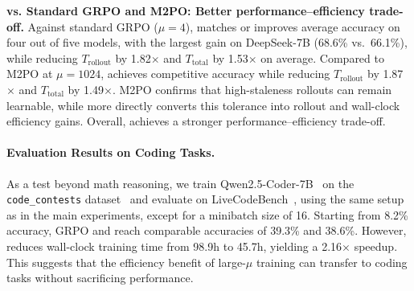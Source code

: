 \textbf{\boldmath \ourmethod{} vs. Standard GRPO and M2PO: Better performance--efficiency trade-off.}
Against standard GRPO ($\mu\!=\!4$), \ourmethod{} matches or improves average
accuracy on four out of five models, with the largest gain on
DeepSeek-7B (68.6\% vs.\ 66.1\%), while reducing $T_{\mathrm{rollout}}$ by
{1.82$\times$} and $T_{\mathrm{total}}$ by {1.53$\times$} on
average. Compared to M2PO at $\mu\!=\!1024$, \ourmethod{} achieves competitive accuracy while
reducing $T_{\mathrm{rollout}}$ by {1.87$\times$} and
$T_{\mathrm{total}}$ by {1.49$\times$}. M2PO confirms that high-staleness
rollouts can remain learnable, while
\ourmethod{} more directly converts this tolerance into rollout and wall-clock
efficiency gains. Overall, \ourmethod{} achieves a stronger performance--efficiency trade-off.


\paragraph{Evaluation Results on Coding Tasks.}
As a test beyond math reasoning, we train Qwen2.5-Coder-7B~\citep{hui2024qwen25codertechnicalreport}
on the \texttt{code\_contests} dataset~\citep{sun2026improvingdataefficiencyllm}
and evaluate on LiveCodeBench~\citep{jain2024livecodebenchholisticcontaminationfree}, using the same setup as in the main experiments, except for a minibatch size of
16. 
Starting from 8.2\% accuracy, GRPO and \ourmethod{} reach comparable
accuracies of 39.3\% and 38.6\%. However, \ourmethod{} reduces
wall-clock training time from 98.9h to 45.7h, yielding a 2.16$\times$ speedup.
This suggests that the efficiency benefit of large-$\mu$ training can transfer to coding tasks without sacrificing performance.


